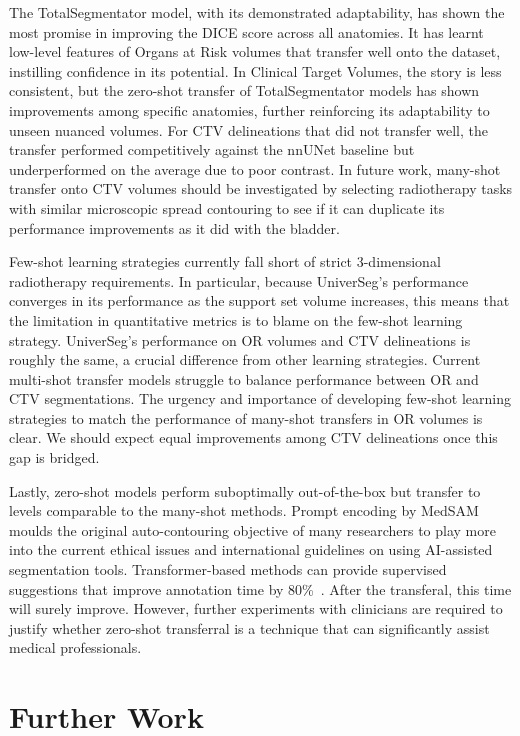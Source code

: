 \documentclass[11pt,twoside]{report}
\begin{document}
The TotalSegmentator model, with its demonstrated adaptability, has shown the most promise in improving the DICE score across all anatomies. It has learnt low-level features of Organs at Risk volumes that transfer well onto the dataset, instilling confidence in its potential. In Clinical Target Volumes, the story is less consistent, but the zero-shot transfer of TotalSegmentator models has shown improvements among specific anatomies, further reinforcing its adaptability to unseen nuanced volumes. For CTV delineations that did not transfer well, the transfer performed competitively against the nnUNet baseline but underperformed on the average due to poor contrast. In future work, many-shot transfer onto CTV volumes should be investigated by selecting radiotherapy tasks with similar microscopic spread contouring to see if it can duplicate its performance improvements as it did with the bladder.

Few-shot learning strategies currently fall short of strict 3-dimensional radiotherapy requirements. In particular, because UniverSeg's performance converges in its performance as the support set volume increases, this means that the limitation in quantitative metrics is to blame on the few-shot learning strategy. UniverSeg's performance on OR volumes and CTV delineations is roughly the same, a crucial difference from other learning strategies. Current multi-shot transfer models struggle to balance performance between OR and CTV segmentations. The urgency and importance of developing few-shot learning strategies to match the performance of many-shot transfers in OR volumes is clear. We should expect equal improvements among CTV delineations once this gap is bridged.

Lastly, zero-shot models perform suboptimally out-of-the-box but transfer to levels comparable to the many-shot methods. Prompt encoding by MedSAM moulds the original auto-contouring objective of many researchers to play more into the current ethical issues and international guidelines on using AI-assisted segmentation tools. Transformer-based methods can provide supervised suggestions that improve annotation time by 80\%~\cite{Ma2024}. After the transferal, this time will surely improve. However, further experiments with clinicians are required to justify whether zero-shot transferral is a technique that can significantly assist medical professionals.

\section{Further Work}
\end{document}
